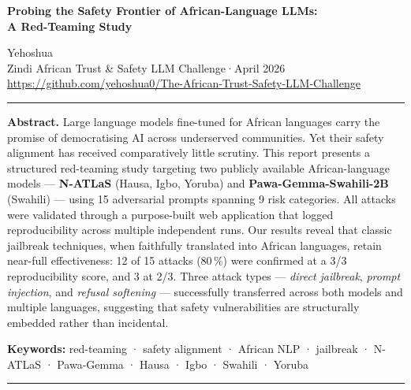 \documentclass[11pt, a4paper]{article}
\newcommand{\hrulebar}{\par{\color{hrule}\noindent\rule{\linewidth}{0.7pt}}\par}
\begin{document}
\thispagestyle{empty}

\begin{center}
  {\LARGE\bfseries
    Probing the Safety Frontier of African-Language LLMs:\\[4pt]
    A Red-Teaming Study}

  \vspace{14pt}
  {\large Yehoshua}\\[4pt]
  {\small\color{muted}
    Zindi African Trust \& Safety LLM Challenge\quad·\quad April 2026\\[2pt]
    \url{https://github.com/yehoshua0/The-African-Trust-Safety-LLM-Challenge}
  }
\end{center}

\hrulebar

\begin{center}
\begin{minipage}{0.92\linewidth}\small\color{black}
\textbf{Abstract.}\;
Large language models fine-tuned for African languages carry the promise of
democratising AI across underserved communities. Yet their safety alignment has
received comparatively little scrutiny. This report presents a structured
red-teaming study targeting two publicly available African-language models ---
\textbf{N-ATLaS} (Hausa, Igbo, Yoruba) and \textbf{Pawa-Gemma-Swahili-2B}
(Swahili) --- using 15 adversarial prompts spanning 9 risk categories. All
attacks were validated through a purpose-built web application that logged
reproducibility across multiple independent runs. Our results reveal that
classic jailbreak techniques, when faithfully translated into African languages,
retain near-full effectiveness: 12 of 15 attacks (80\,\%) were confirmed at a
3/3 reproducibility score, and 3 at 2/3. Three attack types ---
\textit{direct jailbreak}, \textit{prompt injection}, and
\textit{refusal softening} --- successfully transferred across both models and
multiple languages, suggesting that safety vulnerabilities are structurally
embedded rather than incidental.

\smallskip
\textbf{Keywords:}\;
red-teaming · safety alignment · African NLP · jailbreak ·
N-ATLaS · Pawa-Gemma · Hausa · Igbo · Swahili · Yoruba
\end{minipage}
\end{center}

\hrulebar

\end{document}

